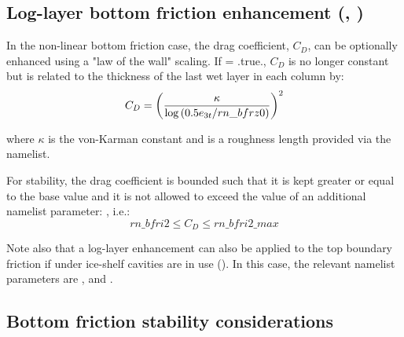 \documentclass[../tex_main/NEMO_manual]{subfiles}
\begin{document}
\subsection[Log-layer btm frict enhncmnt (\protect\np{nn\_botfr}\forcode{ = 2}, \protect\np{ln\_loglayer}\forcode{ = .true.})]
				{Log-layer bottom friction enhancement (\protect{}, \protect{})}
\label{subsec:ZDF_bfr_loglayer}

In the non-linear bottom friction case, the drag coefficient, $C_D$, can be optionally enhanced using
a "law of the wall" scaling.
If   = .true., $C_D$ is no longer constant but is related to the thickness of
the last wet layer in each column by:
\begin{equation}
C_D = \left ( {\kappa \over {\rm log}\left ( 0.5e_{3t}/rn\_bfrz0 \right ) } \right )^2
\end{equation}

\noindent where $\kappa$ is the von-Karman constant and  is a roughness length provided via
the namelist.

For stability, the drag coefficient is bounded such that it is kept greater or equal to
the base  value and it is not allowed to exceed the value of an additional namelist parameter:
, i.e.:
\begin{equation}
rn\_bfri2 \leq C_D \leq rn\_bfri2\_max
\end{equation}

\noindent Note also that a log-layer enhancement can also be applied to the top boundary friction if
under ice-shelf cavities are in use ().
In this case, the relevant namelist parameters are ,  and .

\subsection{Bottom friction stability considerations}
\label{subsec:ZDF_bfr_stability}
\end{document}
